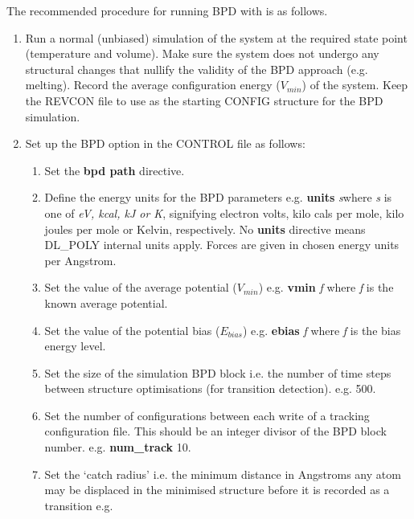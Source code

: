 The recommended procedure for running BPD with \D{} is as follows.
\begin{enumerate}
\item Run a normal (unbiased) simulation of the system at the required
state point (temperature and volume). Make sure the system does not
undergo any structural changes that nullify the validity of the BPD
approach (e.g. melting). Record the average configuration energy
($V_{min}$) of the system. Keep the REVCON file to use as the starting
CONFIG structure for the BPD simulation.
\item Set up the BPD option in the CONTROL file as follows:
\begin{enumerate}
\item Set the {\bf bpd path} directive.
\item Define the energy units for the BPD parameters e.g. \newline
      {\bf units} {\em s}\newline where {\em s} is one of {\em eV,
      kcal, kJ or K}, signifying electron volts, kilo cals per mole,
      kilo joules per mole or Kelvin, respectively. No {\bf units}
      directive means DL\_POLY internal units apply. Forces are given 
      in chosen energy units per Angstrom.
\item Set the value of the average potential ($V_{min}$) e.g.\newline
      {\bf vmin} {\em f} \newline
      where {\em f} is the known average potential.
\item Set the value of the potential bias ($E_{bias}$) e.g. \newline
      {\bf ebias} {\em f} \newline
      where {\em f} is the bias energy level.
\item Set the size of the simulation BPD block i.e. the number of time steps
      between structure optimisations (for transition
      detection). e.g.  500.
\item Set the number of configurations between each write of a tracking
      configuration file. This should be an integer divisor of the BPD
      block number. e.g. \newline
      {\bf num\_track} 10.
\item Set the `catch radius' i.e. the minimum distance 
      in Angstroms any atom may be displaced in the minimised structure 
      before it is recorded as a transition e.g. \newline 

\end{enumerate}
\end{enumerate}
